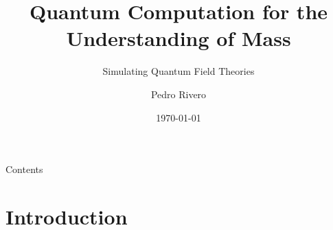 \documentclass[9pt, aspectratio=169]{beamer}
\title{Quantum Computation for the Understanding of Mass}
\subtitle{Simulating Quantum Field Theories}
\author{Pedro Rivero}
\institute{Argonne National Laboratory \\ Illinois Institute of Technology}
\date{\today}
\begin{document}
	\justify
	\setlength{\abovedisplayskip}{0pt}
	\setlength{\belowdisplayskip}{12pt}
	\setlength{\abovedisplayshortskip}{0pt}
	\setlength{\belowdisplayshortskip}{12pt}

\begin{frame}[plain,t]
	\titlepage
\end{frame}

\begin{frame}[c]{Contents}
	\tableofcontents
\end{frame}



\section{Introduction}
\end{document}
